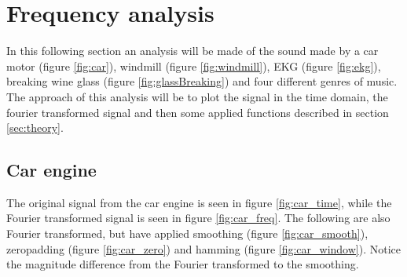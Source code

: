 \section{Frequency analysis}
\label{sec:analysis}

In this following section an analysis will be made of the sound made by a car motor (figure \ref{fig:car}), windmill (figure \ref{fig:windmill}), EKG (figure \ref{fig:ekg}), breaking wine glass (figure \ref{fig:glassBreaking}) and four different genres of music. 
The approach of this analysis will be to plot the signal in the time domain, the fourier transformed signal and then some applied functions described in section \ref{sec:theory}.


\subsection{Car engine}

The original signal from the car engine is seen in figure \ref{fig:car_time}, while the Fourier transformed signal is seen in figure \ref{fig:car_freq}. The following are also Fourier transformed, but have applied smoothing (figure \ref{fig:car_smooth}), zeropadding (figure \ref{fig:car_zero}) and hamming (figure \ref{fig:car_window}). Notice the magnitude difference from the Fourier transformed to the smoothing.

